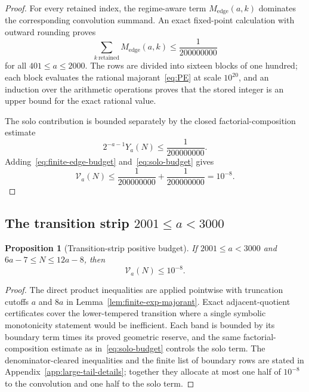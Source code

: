 \documentclass[11pt]{article}
\newtheorem{proposition}[theorem]{Proposition}
\theoremstyle{definition}
\theoremstyle{remark}
\begin{document}
\begin{proof}
For every retained index, the regime-aware term
$M_{\mathrm{edge}}(a,k)$ dominates the corresponding convolution summand.
An exact fixed-point calculation with outward rounding proves
\begin{equation}\label{eq:finite-edge-budget}
  \sum_{k\ \mathrm{retained}}M_{\mathrm{edge}}(a,k)
  \le\frac1{200000000}
\end{equation}
for all $401\le a\le2000$.  The rows are divided into sixteen blocks of one
hundred; each block evaluates the rational majorant~\eqref{eq:PE} at scale
$10^{20}$, and an induction over the arithmetic operations proves that the
stored integer is an upper bound for the exact rational value.

The solo contribution is bounded separately by the closed
factorial-composition estimate
\begin{equation}\label{eq:solo-budget}
  2^{-a-1}Y_a(N)\le\frac1{200000000}.
\end{equation}
Adding~\eqref{eq:finite-edge-budget} and~\eqref{eq:solo-budget} gives
\begin{equation}\label{eq:positive-target}
  \mathcal V_a(N)\le
  \frac1{200000000}+\frac1{200000000}=10^{-8}.
\end{equation}
\end{proof}

\subsection{The transition strip \texorpdfstring{$2001\le a<3000$}{2001<=a<3000}}

\begin{proposition}[Transition-strip positive budget]\label{prop:prefix-positive-budget}
If $2001\le a<3000$ and $6a-7\le N\le12a-8$, then
\[
  \mathcal V_a(N)\le10^{-8}.
\]
\end{proposition}

\begin{proof}
The direct product inequalities are applied pointwise with truncation cutoffs
$a$ and $8a$ in Lemma~\ref{lem:finite-exp-majorant}.  Exact adjacent-quotient
certificates cover the lower-tempered transition where a single symbolic
monotonicity statement would be inefficient.  Each band is bounded by its
boundary term times its proved geometric reserve, and the same
factorial-composition estimate as in~\eqref{eq:solo-budget} controls the solo
term.  The denominator-cleared inequalities and the finite list of boundary
rows are stated in Appendix~\ref{app:large-tail-details}; together they allocate
at most one half of $10^{-8}$ to the convolution and one half to the solo term.
\end{proof}
\end{document}

